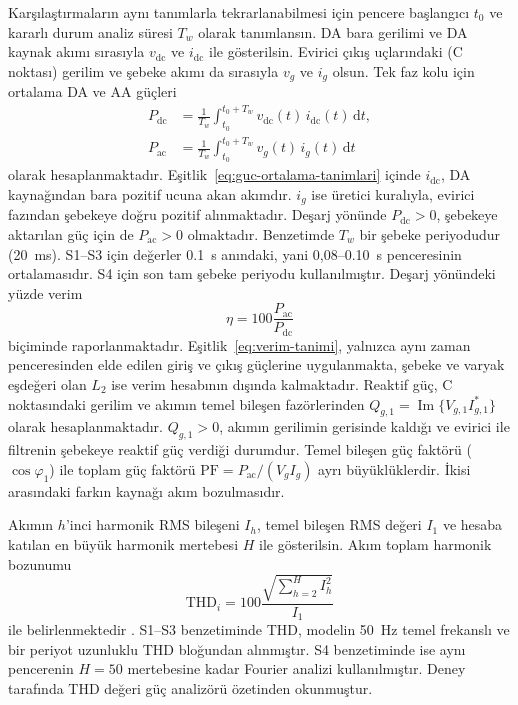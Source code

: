 Karşılaştırmaların aynı tanımlarla tekrarlanabilmesi için pencere başlangıcı $t_0$ ve kararlı durum analiz süresi $T_w$ olarak tanımlansın. DA bara gerilimi ve DA kaynak akımı sırasıyla $v_{\mathrm{dc}}$ ve $i_{\mathrm{dc}}$ ile gösterilsin. Evirici çıkış uçlarındaki (C noktası) gerilim ve şebeke akımı da sırasıyla $v_g$ ve $i_g$ olsun. Tek faz kolu için ortalama DA ve AA güçleri
\begin{equation}
  \begin{aligned}
    P_{\mathrm{dc}} &= \frac{1}{T_w}\int_{t_0}^{t_0+T_w}v_{\mathrm{dc}}(t)\,i_{\mathrm{dc}}(t)\,\mathrm{d}t, \\
    P_{\mathrm{ac}} &= \frac{1}{T_w}\int_{t_0}^{t_0+T_w}v_g(t)\,i_g(t)\,\mathrm{d}t
  \end{aligned}
  \label{eq:guc-ortalama-tanimlari}
\end{equation}
olarak hesaplanmaktadır. Eşitlik~\eqref{eq:guc-ortalama-tanimlari} içinde $i_{\mathrm{dc}}$, DA kaynağından bara pozitif ucuna akan akımdır. $i_g$ ise üretici kuralıyla, evirici fazından şebekeye doğru pozitif alınmaktadır. Deşarj yönünde $P_{\mathrm{dc}}>0$, şebekeye aktarılan güç için de $P_{\mathrm{ac}}>0$ olmaktadır. Benzetimde $T_w$ bir şebeke periyodudur (\SI{20}{\milli\second}). S1--S3 için değerler \SI{0.1}{\second} anındaki, yani 0,08--\SI{0.10}{\second} penceresinin ortalamasıdır. S4 için son tam şebeke periyodu kullanılmıştır. Deşarj yönündeki yüzde verim
\begin{equation}
  \eta=100\frac{P_{\mathrm{ac}}}{P_{\mathrm{dc}}}
  \label{eq:verim-tanimi}
\end{equation}
biçiminde raporlanmaktadır. Eşitlik~\eqref{eq:verim-tanimi}, yalnızca aynı zaman penceresinden elde edilen giriş ve çıkış güçlerine uygulanmakta, şebeke ve varyak eşdeğeri olan $L_2$ ise verim hesabının dışında kalmaktadır. Reaktif güç, C noktasındaki gerilim ve akımın temel bileşen fazörlerinden $Q_{g,1}=\operatorname{Im}\{V_{g,1}I_{g,1}^{\ast}\}$ olarak hesaplanmaktadır. $Q_{g,1}>0$, akımın gerilimin gerisinde kaldığı ve evirici ile filtrenin şebekeye reaktif güç verdiği durumdur. Temel bileşen güç faktörü ($\cos\varphi_1$) ile toplam güç faktörü $\mathrm{PF}=P_{\mathrm{ac}}/(V_gI_g)$ ayrı büyüklüklerdir. İkisi arasındaki farkın kaynağı akım bozulmasıdır.

Akımın $h$'inci harmonik RMS bileşeni $I_h$, temel bileşen RMS değeri $I_1$ ve hesaba katılan en büyük harmonik mertebesi $H$ ile gösterilsin. Akım toplam harmonik bozunumu
\begin{equation}
  \mathrm{THD}_i=100\frac{\sqrt{\sum_{h=2}^{H}I_h^2}}{I_1}
  \label{eq:thd-rmse-tanimlari}
\end{equation}
ile belirlenmektedir \citep{Teodorescu2011,IEC61000}. S1--S3 benzetiminde THD, modelin \SI{50}{\hertz} temel frekanslı ve bir periyot uzunluklu THD bloğundan alınmıştır. S4 benzetiminde ise aynı pencerenin $H=50$ mertebesine kadar Fourier analizi kullanılmıştır. Deney tarafında THD değeri güç analizörü özetinden okunmuştur.

